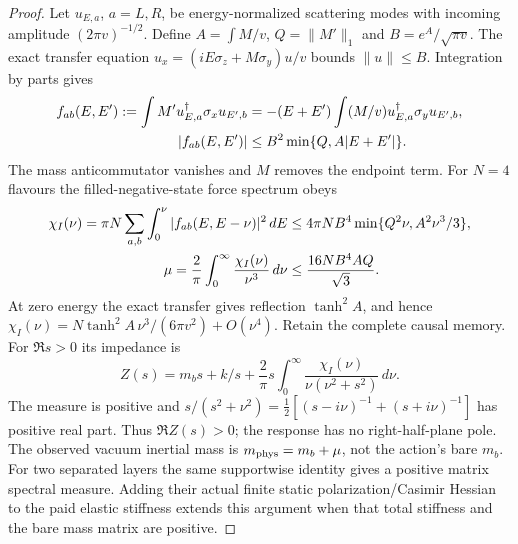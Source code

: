 \begin{proof}
Let $u_{E,a}$, $a=L,R$, be energy-normalized scattering modes with
incoming amplitude $(2\pi v)^{-1/2}$. Define
$A=\int M/v$, $Q=\|M'\|_1$ and $B=e^A/\sqrt{\pi v}$.
The exact transfer equation
$u_x=(iE\sigma_z+M\sigma_y)u/v$ bounds $\|u\|\le B$.
Integration by parts gives
\begin{align}
 f_{ab}(E,E'):=\int M'u_{E,a}^\dagger\sigma_xu_{E',b}
 &=-(E+E')\int(M/v)u_{E,a}^\dagger\sigma_yu_{E',b},\notag\\
 |f_{ab}(E,E')|&\le B^2\min\{Q,A|E+E'|\}.                \label{eq:Dirac-force-identity}
\end{align}
The mass anticommutator vanishes and $M$ removes the endpoint term.
For $N=4$ flavours the filled-negative-state force spectrum obeys
\begin{align}
 \chi_I(\nu)=\pi N\sum_{a,b}\int_0^\nu
                 |f_{ab}(E,E-\nu)|^2\,dE
 &\le4\pi NB^4\min\{Q^2\nu,A^2\nu^3/3\},\notag\\
 \mu=\frac2\pi\int_0^\infty\frac{\chi_I(\nu)}{\nu^3}\,d\nu
 &\le\frac{16NB^4AQ}{\sqrt3}.                             \label{eq:Dirac-vacuum-mass}
\end{align}
At zero energy the exact transfer gives reflection $\tanh^2A$,
and hence $\chi_I(\nu)=N\tanh^2A\,\nu^3/(6\pi v^2)+O(\nu^4)$.
Retain the complete causal memory. For $\Re s>0$ its impedance is
\begin{equation}
 Z(s)=m_bs+k/s+\frac2\pi s\int_0^\infty
              \frac{\chi_I(\nu)}{\nu(\nu^2+s^2)}\,d\nu.  \label{eq:Dirac-passive-impedance}
\end{equation}
The measure is positive and
$s/(s^2+\nu^2)=\tfrac12[(s-i\nu)^{-1}+(s+i\nu)^{-1}]$
has positive real part. Thus $\Re Z(s)>0$; the response has no
right-half-plane pole. The observed vacuum inertial mass is
$m_{\rm phys}=m_b+\mu$, not the action's bare $m_b$.
For two separated layers the same supportwise identity gives a
positive matrix spectral measure. Adding their actual finite static
polarization/Casimir Hessian to the paid elastic stiffness extends
this argument when that total stiffness and the bare mass matrix are
positive.


\end{proof}
